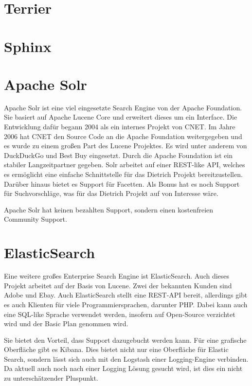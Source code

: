 \cite{TheApacheSoftwareFoundation.2019b}

\section{Terrier}


\section{Sphinx}


\section{Apache Solr}

Apache Solr ist eine viel eingesetzte Search Engine von der Apache Foundation. Sie basiert auf Apache Lucene Core und erweitert dieses um ein Interface. Die Entwicklung dafür begann 2004 als ein internes Projekt von CNET. Im Jahre 2006 hat CNET den Source Code an die Apache Foundation weitergegeben und es wurde zu einem großen Part des Lucene Projektes. Es wird unter anderem von DuckDuckGo und Best Buy eingesetzt. Durch die Apache Foundation ist ein stabiler Langzeitpartner gegeben. 
Solr arbeitet auf einer REST-like API, welches es ermöglicht eine einfache Schnittstelle für das Dietrich Projekt bereitzustellen. Darüber hinaus bietet es Support für Facetten.
Als Bonus hat es noch Support für Suchvorschläge, was für das Dietrich Projekt auf von Interesse wäre.

Apache Solr hat keinen bezahlten Support, sondern einen kostenfreien Community Support.

\cite{TheApacheSoftwareFoundation.2019}

\section{ElasticSearch}

Eine weitere großes Enterprise Search Engine ist ElasticSearch. Auch dieses Projekt arbeitet auf der Basis von Lucene. Zwei der bekannten Kunden sind Adobe und Ebay. Auch ElasticSearch stellt eine REST-API bereit, allerdings gibt es auch Klienten für viele Programmiersprachen, darunter PHP. Dabei kann auch eine SQL-like Sprache verwendet werden, insofern auf Open-Source verzichtet wird und der Basic Plan genommen wird. \cite{ElasticSearchSub.2019}

Sie bietet den Vorteil, dass Support dazugebucht werden kann. Für eine grafische Oberfläche gibt es Kibana. Dies bietet nicht nur eine Oberfläche für Elastic Search, sondern lässt sich auch mit den Logstash einer Logging-Engine verbinden. Da aktuell auch noch nach einer Logging Lösung gesucht wird, ist dies ein nicht zu unterschätzender Pluspunkt. 

